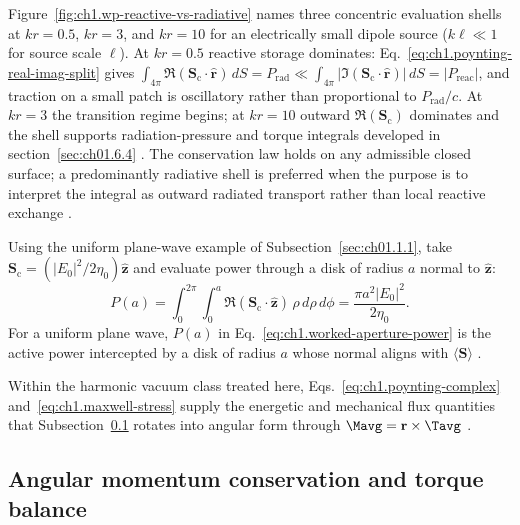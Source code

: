 Figure~\ref{fig:ch1.wp-reactive-vs-radiative} names three concentric evaluation shells at $kr=0.5$, $kr=3$, and $kr=10$ for an electrically small dipole source ($k\ell\ll1$ for source scale $\ell$). At $kr=0.5$ reactive
storage dominates: Eq.~\eqref{eq:ch1.poynting-real-imag-split} gives
\(\int_{4\pi}\Re(\mathbf{S}_\mathrm{c}\cdot\hat{\mathbf{r}})\,dS=P_{\mathrm{rad}}\ll
\int_{4\pi}|\Im(\mathbf{S}_\mathrm{c}\cdot\hat{\mathbf{r}})|\,dS=|P_{\mathrm{reac}}|\), and traction on a
small patch is oscillatory rather than proportional to \(P_{\mathrm{rad}}/c\). At
$kr=3$ the transition regime begins; at
$kr=10$ outward $\Re(\mathbf{S}_\mathrm{c})$ dominates and the shell supports radiation-pressure and torque integrals developed in
section~\ref{sec:ch01.6.4} \cite{stratton1941,chu1948}.
The conservation law holds on any admissible closed surface; a predominantly radiative shell is preferred when the purpose is to interpret the integral as outward radiated transport rather than local reactive exchange \cite{chu1948,stratton1941}.

Using the uniform plane-wave example of Subsection~\ref{sec:ch01.1.1}, take $\mathbf{S}_\mathrm{c}=(|E_0|^2/2\eta_0)\hat{\mathbf{z}}$
and evaluate power through a disk of radius $a$ normal to $\hat{\mathbf{z}}$:
\begin{equation}
\label{eq:ch1.worked-aperture-power}
P(a)=\int_0^{2\pi}\!\!\int_0^a \Re(\mathbf{S}_\mathrm{c}\cdot\hat{\mathbf{z}})\,\rho\,d\rho\,d\phi
=\frac{\pi a^2 |E_0|^2}{2\eta_0}.
\end{equation}
For a uniform plane wave, $P(a)$ in Eq.~\eqref{eq:ch1.worked-aperture-power} is the active power intercepted by a disk of radius $a$ whose normal aligns with $\langle\mathbf{S}\rangle$ \cite{poynting1884}.

Within the harmonic vacuum class treated here, Eqs.~\eqref{eq:ch1.poynting-complex} and~\eqref{eq:ch1.maxwell-stress} supply the energetic and mechanical flux quantities that Subsection~\ref{sec:ch01.1.5} rotates into angular form through $\Mavg=\mathbf{r}\times\Tavg$ \cite{stratton1941}.

\subsection{Angular momentum conservation and torque balance}
\label{sec:ch01.1.5}

